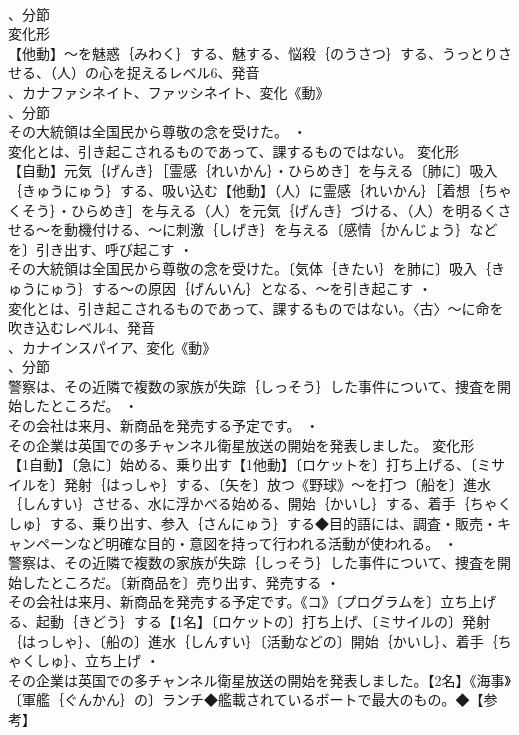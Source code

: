 \documentclass[8pt]{extreport}
\begin{document}
\begin{CJK}{UTF8}{min}
\\	、分節
\\	変化形 
\\	【他動】～を魅惑｛みわく｝する、魅する、悩殺｛のうさつ｝する、うっとりさせる、（人）の心を捉えるレベル6、発音
\\	、カナファシネイト、ファッシネイト、変化《動》
\\	、分節
\\	その大統領は全国民から尊敬の念を受けた。 ・
\\	変化とは、引き起こされるものであって、課するものではない。	変化形 
\\	【自動】元気｛げんき｝［霊感｛れいかん｝・ひらめき］を与える〔肺に〕吸入｛きゅうにゅう｝する、吸い込む【他動】（人）に霊感｛れいかん｝［着想｛ちゃくそう｝・ひらめき］を与える（人）を元気｛げんき｝づける、（人）を明るくさせる～を動機付ける、～に刺激｛しげき｝を与える〔感情｛かんじょう｝などを〕引き出す、呼び起こす ・
\\	その大統領は全国民から尊敬の念を受けた。〔気体｛きたい｝を肺に〕吸入｛きゅうにゅう｝する～の原因｛げんいん｝となる、～を引き起こす ・
\\	変化とは、引き起こされるものであって、課するものではない。〈古〉～に命を吹き込むレベル4、発音
\\	、カナインスパイア、変化《動》
\\	、分節
\\	警察は、その近隣で複数の家族が失踪｛しっそう｝した事件について、捜査を開始したところだ。 ・
\\	その会社は来月、新商品を発売する予定です。 ・
\\	その企業は英国での多チャンネル衛星放送の開始を発表しました。	変化形 
\\	【1自動】〔急に〕始める、乗り出す【1他動】〔ロケットを〕打ち上げる、〔ミサイルを〕発射｛はっしゃ｝する、〔矢を〕放つ《野球》～を打つ〔船を〕進水｛しんすい｝させる、水に浮かべる始める、開始｛かいし｝する、着手｛ちゃくしゅ｝する、乗り出す、参入｛さんにゅう｝する◆目的語には、調査・販売・キャンペーンなど明確な目的・意図を持って行われる活動が使われる。 ・
\\	警察は、その近隣で複数の家族が失踪｛しっそう｝した事件について、捜査を開始したところだ。〔新商品を〕売り出す、発売する ・
\\	その会社は来月、新商品を発売する予定です。《コ》〔プログラムを〕立ち上げる、起動｛きどう｝する【1名】〔ロケットの〕打ち上げ、〔ミサイルの〕発射｛はっしゃ｝、〔船の〕進水｛しんすい｝〔活動などの〕開始｛かいし｝、着手｛ちゃくしゅ｝、立ち上げ ・
\\	その企業は英国での多チャンネル衛星放送の開始を発表しました。【2名】《海事》〔軍艦｛ぐんかん｝の〕ランチ◆艦載されているボートで最大のもの。◆【参考】

\end{CJK}
\end{document}
